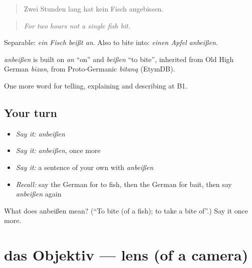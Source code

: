 \begin{quote}
Zwei Stunden lang hat kein Fisch angebissen.
\end{quote}

\begin{quote}
\emph{For two hours not a single fish bit.}
\end{quote}

Separable: \emph{ein Fisch beißt an}. Also to bite into: \emph{einen Apfel anbeißen}.

\begin{cousinweb}
\emph{anbeißen} is built on \emph{an} \textquotedblleft{}on\textquotedblright{} and \emph{beißen} \textquotedblleft{}to bite\textquotedblright{}, inherited from Old High German \emph{bīzan}, from Proto-Germanic \emph{bītaną} (EtymDB).
\end{cousinweb}

\begin{grammarlens}[title={What you've built}]
One more word for telling, explaining and describing at B1.
\end{grammarlens}

\subsection*{Your turn}
\begin{itemize}
\raggedright
  \item \emph{Say it:} \emph{anbeißen}
  \item \emph{Say it:} \emph{anbeißen}, once more
  \item \emph{Say it:} a sentence of your own with \emph{anbeißen}
  \item \emph{Recall:} say the German for to fish, then the German for bait, then say \emph{anbeißen} again
\end{itemize}

\begin{tcolorbox}[breakable,colback=teal!4,colframe=teal!35!black,title={Before you move on}]
What does anbeißen mean? (\textquotedblleft{}To bite (of a fish); to take a bite of\textquotedblright{}.) Say it once more.
\end{tcolorbox}
\section[das Objektiv]{das Objektiv — lens (of a camera)}

\label{lesson:GE-C502-objektiv}



